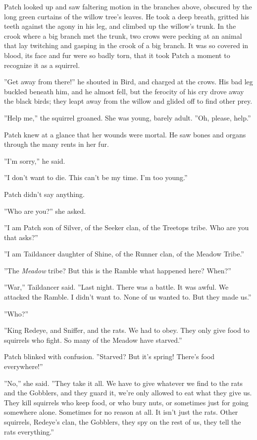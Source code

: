 \documentclass[12pt]{book}
\begin{document}
 Patch looked up and saw faltering motion in the branches above, obscured by the long green curtains of the willow tree's leaves. He took a deep breath, gritted his teeth against the agony in his leg, and climbed up the willow's trunk. In the crook where a big branch met the trunk, two crows were pecking at an animal that lay twitching and gasping in the crook of a big branch. It was so covered in blood, its face and fur were so badly torn, that it took Patch a moment to recognize it as a squirrel.\par
 ''Get away from there!'' he shouted in Bird, and charged at the crows. His bad leg buckled beneath him, and he almost fell, but the ferocity of his cry drove away the black birds; they leapt away from the willow and glided off to find other prey.\par
 ''Help me,'' the squirrel groaned. She was young, barely adult. ''Oh, please, help.''\par
 Patch knew at a glance that her wounds were mortal. He saw bones and organs through the many rents in her fur.\par
 ''I'm sorry,'' he said.\par
 ''I don't want to die. This can't be my time. I'm too young.''\par
 Patch didn't say anything.\par
 ''Who are you?'' she asked.\par
 ''I am Patch son of Silver, of the Seeker clan, of the Treetops tribe. Who are you that asks?''\par
 ''I am Taildancer daughter of Shine, of the Runner clan, of the Meadow Tribe.''\par
 ''The {\it Meadow} tribe? But this is the Ramble %
 what happened here? When?''\par
 ''War,'' Taildancer said. ''Last night. There was a battle. It was awful. We attacked the Ramble. I didn't want to. None of us wanted to. But they made us.''\par
 ''Who?''\par
 ''King Redeye, and Sniffer, and the rats. We had to obey. They only give food to squirrels who fight. So many of the Meadow have starved.''\par
 Patch blinked with confusion. ''Starved? But it's spring! There's food everywhere!''\par
 ''No,'' she said. ''They take it all. We have to give whatever we find to the rats and the Gobblers, and they guard it, we're only allowed to eat what they give us. They kill squirrels who keep food, or who bury nuts, or sometimes just for going somewhere alone. Sometimes for no reason at all. It isn't just the rats. Other squirrels, Redeye's clan, the Gobblers, they spy on the rest of us, they tell the rats everything.''\par
\end{document}
